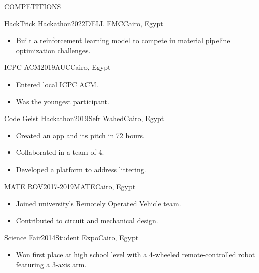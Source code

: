 \documentclass{resume}
\begin{document}
\hfill
\begin{minipage}[t]{0.49\textwidth}

	\begin{rsection}{\MakeUppercase{competitions}}{}

		\begin{rcontent}{HackTrick Hackathon}{2022}{DELL EMC}{Cairo, Egypt}
			\begin{itemize}
				\item Built a reinforcement learning model to compete in material pipeline optimization challenges.
			\end{itemize}
		\end{rcontent}
		\divider
		\begin{rcontent}{ICPC ACM}{2019}{AUC}{Cairo, Egypt}
			\begin{itemize}
				\item Entered local ICPC ACM.
				\item Was the youngest participant.
			\end{itemize}
		\end{rcontent}
		\divider
		\begin{rcontent}{Code Geist Hackathon}{2019}{Sefr Wahed}{Cairo, Egypt}
			\begin{itemize}
				\item Created an app and its pitch in 72 hours.
				\item Collaborated in a team of 4.
				\item Developed a platform to address littering.
			\end{itemize}
		\end{rcontent}
		\divider
		\begin{rcontent}{MATE ROV}{2017-2019}{MATE}{Cairo, Egypt}
			\begin{itemize}
				\item Joined university's Remotely Operated Vehicle team.
				\item Contributed to circuit and mechanical design.
			\end{itemize}
		\end{rcontent}
		\divider
		\begin{rcontent}{Science Fair}{2014}{Student Expo}{Cairo, Egypt}
			\begin{itemize}
				\item Won first place at high school level with a 4-wheeled remote-controlled robot featuring a 3-axis arm.
			\end{itemize}
		\end{rcontent}
	\end{rsection}


\end{minipage}
\end{document}
